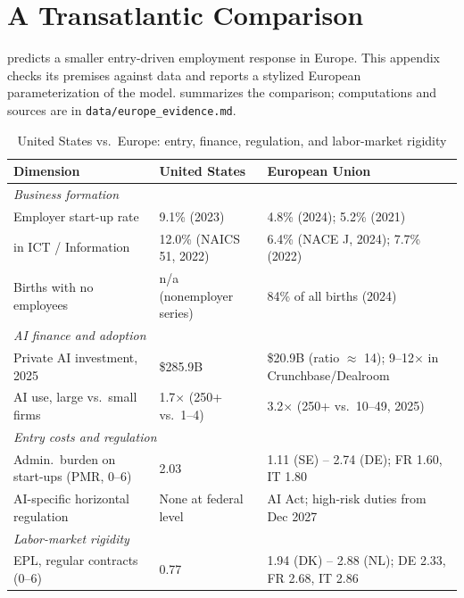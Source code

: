 \section{A Transatlantic Comparison}\label{app:europe}


 predicts a smaller entry-driven employment response in Europe.
This appendix checks its premises against data and reports a stylized European parameterization of the model.
 summarizes the comparison; computations and sources are in \texttt{data/europe\_evidence.md}.

\begin{table}[h]
  \centering
  \caption{United States vs.\ Europe: entry, finance, regulation, and labor-market rigidity}
  \label{tab:us-europe}
  \small
  \begin{tabular}{p{4.6cm}p{4.3cm}p{5.4cm}}
    \toprule
    Dimension & United States & European Union \\
    \midrule
    \multicolumn{3}{l}{\textit{Business formation}} \\
    Employer start-up rate & 9.1\% (2023) & 4.8\% (2024); 5.2\% (2021) \\
    \quad in ICT / Information & 12.0\% (NAICS 51, 2022) & 6.4\% (NACE J, 2024); 7.7\% (2022) \\
    Births with no employees & n/a (nonemployer series) & 84\% of all births (2024) \\
    \midrule
    \multicolumn{3}{l}{\textit{AI finance and adoption}} \\
    Private AI investment, 2025 & \$285.9B & \$20.9B (ratio $\approx$ 14); 9--12$\times$ in Crunchbase/Dealroom \\
    AI use, large vs.\ small firms & 1.7$\times$ (250+ vs.\ 1--4) & 3.2$\times$ (250+ vs.\ 10--49, 2025) \\
    \midrule
    \multicolumn{3}{l}{\textit{Entry costs and regulation}} \\
    Admin.\ burden on start-ups (PMR, 0--6) & 2.03 & 1.11 (SE) -- 2.74 (DE); FR 1.60, IT 1.80 \\
    AI-specific horizontal regulation & None at federal level & AI Act; high-risk duties from Dec 2027 \\
    \midrule
    \multicolumn{3}{l}{\textit{Labor-market rigidity}} \\
    EPL, regular contracts (0--6) & 0.77 & 1.94 (DK) -- 2.88 (NL); DE 2.33, FR 2.68, IT 2.86 \\

\end{tabular}
\end{table}
